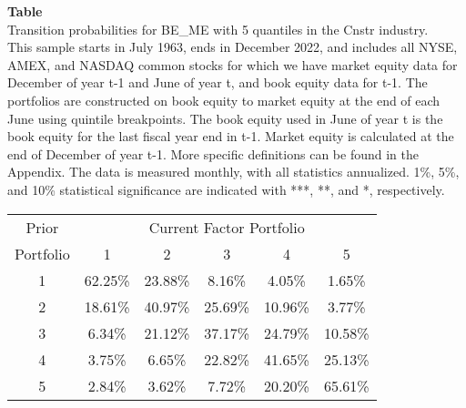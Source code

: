 \begin{table*}[ht!]
\raggedright
{}
\label{tab: transition_probs_BE_ME_Cnstr_with_5_quantiles}
\textbf{Table \thetable} \\
Transition probabilities for BE_ME with 5 quantiles in the Cnstr industry. \\
\hspace*{1em}This sample starts in July 1963, ends in December 2022, and includes all NYSE, AMEX, and NASDAQ common stocks for which we have market equity data for December of year t-1 and June of year t, and book equity data for t-1. The portfolios are constructed on book equity to market equity at the end of each June using quintile breakpoints.  The book equity used in June of year t is the book equity for the last fiscal year end in t-1.  Market equity is calculated at the end of December of year t-1.  More specific definitions can be found in the Appendix.  The data is measured monthly, with all statistics annualized.  1\%, 5\%, and 10\% statistical significance are indicated with ***, **, and *, respectively. \\
\vspace{0.5em}
\centering
\begin{adjustbox}{max width=\textwidth}
\begin{tabular}{@{}cccccc@{}}
\toprule
Prior & \multicolumn{5}{c}{Current Factor Portfolio} \\
Portfolio & 1 & 2 & 3 & 4 & 5 \\
\midrule
1 & 62.25\% & 23.88\% & 8.16\% & 4.05\% & 1.65\% \\
2 & 18.61\% & 40.97\% & 25.69\% & 10.96\% & 3.77\% \\
3 & 6.34\% & 21.12\% & 37.17\% & 24.79\% & 10.58\% \\
4 & 3.75\% & 6.65\% & 22.82\% & 41.65\% & 25.13\% \\
5 & 2.84\% & 3.62\% & 7.72\% & 20.20\% & 65.61\% \\
\bottomrule
\end{tabular}
\end{adjustbox}
\end{table*}
